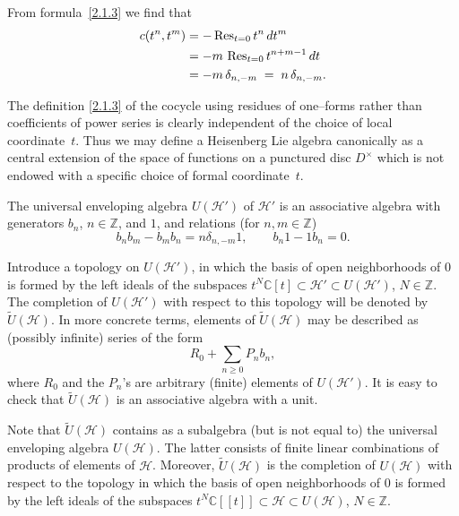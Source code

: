 \documentclass[12pt]{article}
\begin{document}
From formula~\eqref{2.1.3} we find that
\[
    \begin{aligned}
        c(t^n, t^m)
         & = -\operatorname{Res}_{t=0} t^n\,dt^m        \\
         & = -m\,\operatorname{Res}_{t=0} t^{n+m-1}\,dt \\
         & = -m\,\delta_{n,-m}
        \;=\; n\,\delta_{n,-m}.
    \end{aligned}
\]

The definition \eqref{2.1.3} of the cocycle using residues of one–forms rather than coefficients of power series is clearly independent of the choice of local coordinate~$t$.
Thus we may define a Heisenberg Lie algebra canonically as a central extension of the space of functions on a punctured disc $D^\times$ which is not endowed with a specific choice of formal coordinate~$t$.


The universal enveloping algebra $U(\mathcal{H}')$ of $\mathcal{H}'$ is an associative algebra with generators $b_n$, $n\in\mathbb{Z}$, and $1$, and relations (for $n,m\in\mathbb{Z}$)
\[
    b_n b_m - b_m b_n = n \delta_{n,-m} 1,
    \qquad
    b_n 1 - 1 b_n = 0.
\]

Introduce a topology on $U(\mathcal{H}')$, in which the basis of open neighborhoods of $0$ is formed by the left ideals of the subspaces
$t^N\mathbb{C}[t] \subset \mathcal{H}' \subset U(\mathcal{H}')$, $N\in\mathbb{Z}$.
The completion of $U(\mathcal{H}')$ with respect to this topology will be denoted by $\widetilde{U}(\mathcal{H})$.
In more concrete terms, elements of $\widetilde{U}(\mathcal{H})$ may be described as (possibly infinite) series of the form
\[
    R_0 + \sum_{n\ge 0} P_n b_n,
\]
where $R_0$ and the $P_n$’s are arbitrary (finite) elements of $U(\mathcal{H}')$.
It is easy to check that $\widetilde{U}(\mathcal{H})$ is an associative algebra with a unit.

Note that $\widetilde{U}(\mathcal{H})$ contains as a subalgebra (but is not equal to) the universal enveloping algebra $U(\mathcal{H})$.
The latter consists of finite linear combinations of products of elements of $\mathcal{H}$.
Moreover, $\widetilde{U}(\mathcal{H})$ is the completion of $U(\mathcal{H})$ with respect to the topology in which the basis of open neighborhoods of $0$ is formed by the left ideals of the subspaces
$t^N\mathbb{C}[[t]] \subset \mathcal{H} \subset U(\mathcal{H})$, $N\in\mathbb{Z}$.
\end{document}
